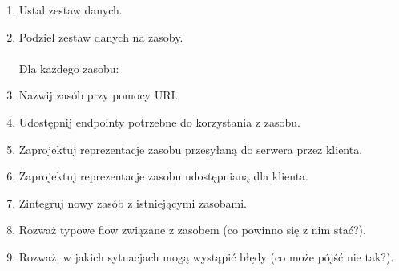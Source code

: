 \begin{enumerate}
	\item Ustal zestaw danych.
	\item Podziel zestaw danych na zasoby. \\~\\
	Dla każdego zasobu:
	\item Nazwij zasób przy pomocy URI.
	\item Udostępnij endpointy potrzebne do korzystania z zasobu.
	\item Zaprojektuj reprezentacje zasobu przesyłaną do serwera przez klienta.
	\item Zaprojektuj reprezentacje zasobu udostępnianą dla klienta.
	\item Zintegruj nowy zasób z istniejącymi zasobami.
	\item Rozważ typowe flow związane z zasobem (co powinno się z nim stać?).
	\item Rozważ, w jakich sytuacjach mogą wystąpić błędy (co może pójść nie tak?).
\end{enumerate}

